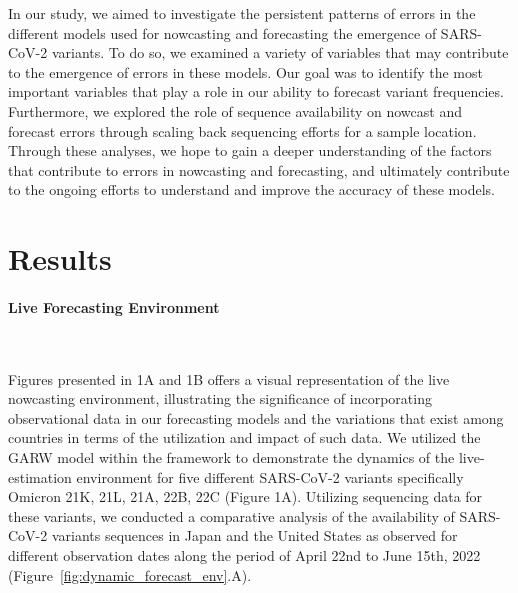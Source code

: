 \documentclass[11pt,oneside,letterpaper]{article}
\begin{document}
In our study, we aimed to investigate the persistent patterns of errors in the different models used for nowcasting and forecasting the emergence of SARS-CoV-2 variants. 
To do so, we examined a variety of variables that may contribute to the emergence of errors in these models. 
Our goal was to identify the most important variables that play a role in our ability to forecast variant frequencies.
Furthermore, we explored the role of sequence availability on nowcast and forecast errors through scaling back sequencing efforts for a sample location.
Through these analyses, we hope to gain a deeper understanding of the factors that contribute to errors in nowcasting and forecasting, and ultimately contribute to the ongoing efforts to understand and improve the accuracy of these models.



\section*{Results} 


\paragraph{Live Forecasting Environment}\

Figures presented in 1A and 1B offers a visual representation of the live nowcasting environment, illustrating the significance of incorporating observational data in our forecasting models and the variations that exist among countries in terms of the utilization and impact of such data.
We utilized the GARW model within the framework to demonstrate the dynamics of the live-estimation environment for five different SARS-CoV-2 variants specifically Omicron 21K, 21L, 21A, 22B, 22C (Figure 1A).
Utilizing sequencing data for these variants, we conducted a comparative analysis of the availability of SARS-CoV-2 variants sequences in Japan and the United States as observed for different observation dates along the period of April 22nd to June 15th, 2022 (Figure~\ref{fig:dynamic_forecast_env}.A).
\end{document}
